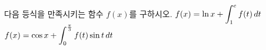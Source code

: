 다음 등식을 만족시키는 함수 $f(x)$를 구하시오.
 $f(x)=\ln x+\displaystyle\int_{1}^{e}f(t)\mkern3mu dt$
 $f(x)=\cos x+\displaystyle\int_{0}^{\frac{\pi}{3}}f(t)\sin t\mkern3mu dt$
